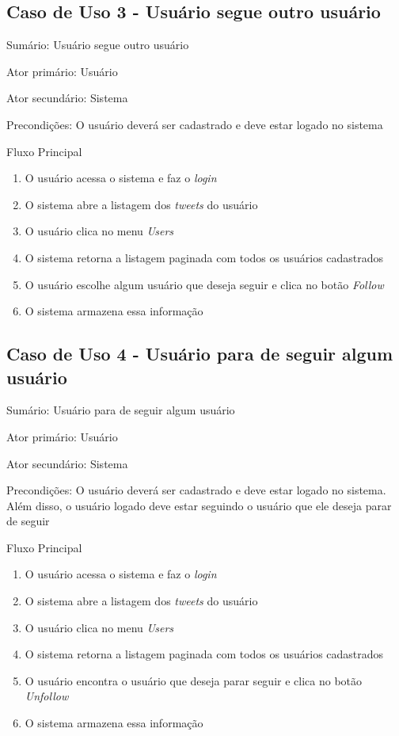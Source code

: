 \subsection{Caso de Uso 3 - Usuário segue outro usuário}
\label{subsec:useCaseUserFollow}

Sumário: Usuário segue outro usuário

Ator primário: Usuário

Ator secundário: Sistema

Precondições: O usuário deverá ser cadastrado e deve estar logado no sistema

Fluxo Principal
\begin{enumerate}
\item O usuário acessa o sistema e faz o \textit{login}
\item O sistema abre a listagem dos \textit{tweets} do usuário
\item O usuário clica no menu \textit{Users}
\item O sistema retorna a listagem paginada com todos os usuários cadastrados
\item O usuário escolhe algum usuário que deseja seguir e clica no botão \textit{Follow}
\item O sistema armazena essa informação
\end{enumerate}

\subsection{Caso de Uso 4 - Usuário para de seguir algum usuário}
\label{subsec:useCaseUserUnfollow}

Sumário: Usuário para de seguir algum usuário

Ator primário: Usuário

Ator secundário: Sistema

Precondições: O usuário deverá ser cadastrado e deve estar logado no sistema. Além disso, o usuário logado deve estar seguindo o usuário que ele deseja parar de seguir

Fluxo Principal
\begin{enumerate}
\item O usuário acessa o sistema e faz o \textit{login}
\item O sistema abre a listagem dos \textit{tweets} do usuário
\item O usuário clica no menu \textit{Users}
\item O sistema retorna a listagem paginada com todos os usuários cadastrados
\item O usuário encontra o usuário que deseja parar seguir e clica no botão \textit{Unfollow}
\item O sistema armazena essa informação
\end{enumerate}

